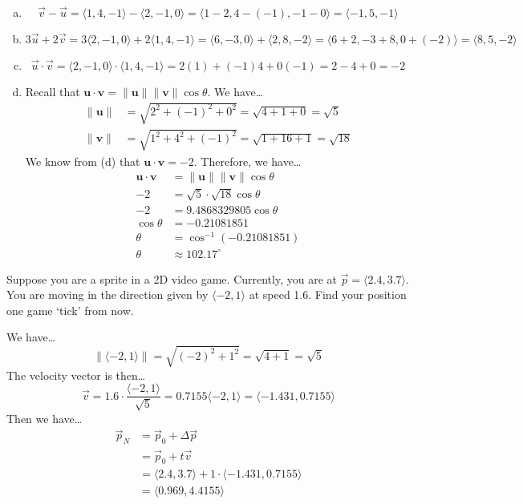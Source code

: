 \documentclass[12pt,letterpaper]{exam}
\begin{document}
\begin{questions}
\begin{enumerate}[(a)]
\item 
	\[
	\vec{v} - \vec{u}= \langle 1, 4, -1 \rangle - \langle 2, -1, 0 \rangle= \langle 1 - 2, 4 - (-1), -1 - 0 \rangle= \langle -1, 5, -1 \rangle 
	\] \pspace

\item 
	\[
	3 \vec{u} + 2 \vec{v}= 3 \langle 2, -1, 0 \rangle + 2 \langle 1, 4, -1 \rangle= \langle 6, -3, 0 \rangle + \langle 2, 8, -2 \rangle= \langle 6 + 2, -3 + 8, 0 + (-2) \rangle= \langle 8, 5, -2 \rangle 
	\] \pspace

\item 
	\[
	\vec{u} \cdot \vec{v}= \langle 2, -1, 0 \rangle \cdot \langle 1, 4, -1 \rangle= 2(1) + (-1)4 + 0(-1)= 2 - 4 + 0= -2
	\] \pspace

\item Recall that $\mathbf{u} \cdot \mathbf{v}= \| \mathbf{u} \| \| \mathbf{v} \| \cos \theta$. We have\dots
	\[
	\begin{aligned}
	\| \mathbf{u} \|&= \sqrt{2^2 + (-1)^2 + 0^2}= \sqrt{4 + 1 + 0}= \sqrt{5} \\[0.3cm]
	\| \mathbf{v} \|&= \sqrt{1^2 + 4^2 + (-1)^2}= \sqrt{1 + 16 + 1}= \sqrt{18}
	\end{aligned}
	\]
We know from (d) that $\mathbf{u} \cdot \mathbf{v}= -2$. Therefore, we have\dots
	\[
	\begin{aligned}
	\mathbf{u} \cdot \mathbf{v}&= \| \mathbf{u} \| \| \mathbf{v} \| \cos \theta \\[0.3cm]
	-2&= \sqrt{5} \cdot \sqrt{18} \cos \theta \\[0.3cm]
	-2&= 9.4868329805 \cos \theta \\[0.3cm]
	\cos \theta&= -0.21081851 \\[0.3cm]
	\theta&= \cos^{-1}(-0.21081851) \\[0.3cm]
	\theta&\approx 102.17^\circ
	\end{aligned}
	\]
\end{enumerate}



\newpage
\question[10] Suppose you are a sprite in a 2D video game. Currently, you are at $\vec{p}= \langle 2.4, 3.7 \rangle$. You are moving in the direction given by $\langle -2, 1 \rangle$ at speed 1.6. Find your position one game `tick' from now. \pspace

\sol We have\dots
	\[
	\| \langle -2, 1 \rangle \|= \sqrt{(-2)^2 + 1^2}= \sqrt{4 + 1}= \sqrt{5}
	\]
The velocity vector is then\dots
	\[
	\vec{v}= 1.6 \cdot \dfrac{\langle -2, 1 \rangle}{\sqrt{5}}= 0.7155 \langle -2, 1 \rangle= \langle -1.431, 0.7155 \rangle 
	\]
Then we have\dots
	\[
	\begin{aligned}
	\vec{p}_N&= \vec{p}_0 + \Delta \vec{p} \\[0.3cm]
	&= \vec{p}_0 + t \vec{v} \\[0.3cm]
	&= \langle 2.4, 3.7 \rangle + 1 \cdot \langle -1.431, 0.7155 \rangle \\[0.3cm]
	&= \langle 0.969, 4.4155 \rangle 
	\end{aligned}
	\]




\end{questions}
\end{document}
